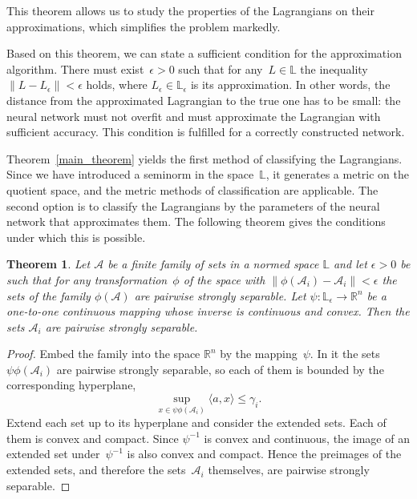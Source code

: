 \documentclass[sn-mathphys-num]{sn-jnl}
\theoremstyle{thmstylethree}
\theoremstyle{thmstyletwo}
\theoremstyle{thmstyleone}
\newtheorem{theorem}{Theorem}
\begin{document}
This theorem allows us to study the properties of the Lagrangians on their approximations,
which simplifies the problem markedly.

Based on this theorem, we can state a sufficient condition for the approximation algorithm.
There must exist~$\epsilon > 0$ such that for any~$L \in \mathbb{L}$ the inequality $\|L - L_{\epsilon}\| < \epsilon$ holds, where $L_\epsilon \in \mathbb{L}_\epsilon$ is its approximation. In other words, the distance from the approximated Lagrangian to the true one has to be small: the neural network must not overfit and must approximate the Lagrangian with sufficient accuracy. This condition is fulfilled for a correctly constructed network.

Theorem~\ref{main_theorem} yields the first method of classifying the Lagrangians. Since we have introduced a seminorm in the space~$\mathbb{L}$, it generates a metric on the quotient space, and the metric methods of classification are applicable. The second option is to classify the Lagrangians by the parameters of the neural network that approximates them. The following theorem gives the conditions under which this is possible.

\begin{theorem} \label{r_theorem}
Let $\mathcal{A}$ be a finite family of sets in a normed space $\mathbb{L}$ and let $\epsilon > 0$ be such that for any transformation~$\phi$ of the space with $\|\phi(\mathcal{A}_{i}) - \mathcal{A}_{i}\| < \epsilon$ the sets of the family $\phi(\mathcal{A})$ are pairwise
strongly separable. Let $\psi \colon \mathbb{L}_{\epsilon} \rightarrow \mathbb{R}^{n}$ be a one-to-one continuous mapping whose inverse is continuous and convex. Then the sets $\mathcal{A}_{i}$ are pairwise strongly separable.
\end{theorem}

\begin{proof}
Embed the family into the space $\mathbb{R}^{n}$ by the mapping~$\psi$. In it the sets $\psi\phi(\mathcal{A}_{i})$ are pairwise strongly separable, so each of them is bounded by the corresponding hyperplane,
\[
\sup_{x \in \psi\phi(\mathcal{A}_{i})}{\langle a, x \rangle}\leq \gamma_{i}.
\]
Extend each set up to its hyperplane and consider the extended sets. Each of them is convex and compact. Since $\psi^{-1}$ is convex and continuous, the image of an extended set under~$\psi^{-1}$ is also convex and compact. Hence the preimages of the extended sets, and therefore the sets~$\mathcal{A}_i$ themselves, are pairwise strongly separable.
\end{proof}
\end{document}

